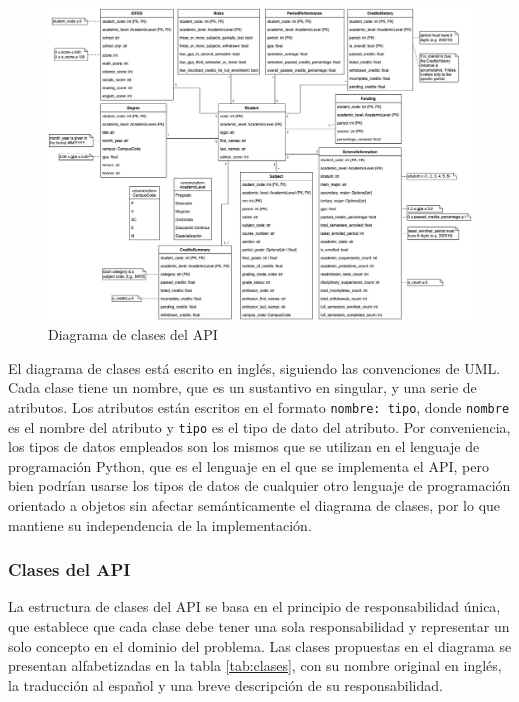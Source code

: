 \begin{figure}[h]
	\centering
	\includegraphics[width=\textwidth]{img/diagrama-clases.jpg}
	\caption{Diagrama de clases del API}
	\label{fig:diagrama_clases}
\end{figure}

El diagrama de clases está escrito en inglés, siguiendo las convenciones de UML. Cada clase tiene un nombre, que es un sustantivo en singular, y una serie de atributos. Los atributos están escritos en el formato \texttt{nombre: tipo}, donde \texttt{nombre} es el nombre del atributo y \texttt{tipo} es el tipo de dato del atributo. Por conveniencia, los tipos de datos empleados son los mismos que se utilizan en el lenguaje de programación Python, que es el lenguaje en el que se implementa el API, pero bien podrían usarse los tipos de datos de cualquier otro lenguaje de programación orientado a objetos sin afectar semánticamente el diagrama de clases, por lo que mantiene su independencia de la implementación.

\subsubsection{Clases del API}

La estructura de clases del API se basa en el principio de responsabilidad única, que establece que cada clase debe tener una sola responsabilidad y representar un solo concepto en el dominio del problema. Las clases propuestas en el diagrama se presentan alfabetizadas en la tabla \ref{tab:clases}, con su nombre original en inglés, la traducción al español y una breve descripción de su responsabilidad.

